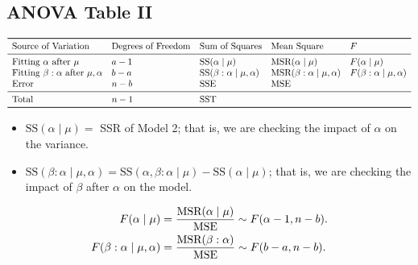 \subsection*{ANOVA Table II}
\[ \begin{array}{lllll}
        \toprule
        \text{Source of Variation}                          & \text{Degrees of Freedom} & \text{Sum of Squares}                  & \text{Mean Square}                      & F                               \\
        \midrule
        \text{Fitting }\alpha\text{ after }\mu              & a-1                       & \text{SS}(\alpha\mid \mu)              & \text{MSR}(\alpha\mid \mu)              & F(\alpha\mid \mu)               \\
        \text{Fitting }\beta:\alpha\text{ after }\mu,\alpha & b-a                       & \text{SS}(\beta:\alpha\mid \mu,\alpha) & \text{MSR}(\beta:\alpha\mid \mu,\alpha) & F(\beta: \alpha\mid \mu,\alpha) \\
        \text{Error}                                        & n-b                       & \SSE                                   & \MSE                                                                      \\
        \midrule
        \text{Total}                                        & n-1                       & \SST                                                                                                               \\
        \bottomrule
    \end{array} \]
\begin{itemize}
    \item $ \text{SS}(\alpha\mid \mu)= $ SSR of Model 2; that is, we are checking the impact of
          $ \alpha $ on the variance.
    \item $ \text{SS}(\beta:\alpha\mid \mu,\alpha)=\text{SS}(\alpha,\beta:\alpha\mid \mu)-\text{SS}(\alpha\mid \mu) $; that is,
          we are checking the impact of $ \beta $ after $ \alpha $ on the model.
\end{itemize}
\begin{align*}
    F(\alpha\mid \mu)
     & =\frac{\text{MSR}(\alpha\mid \mu)}{\text{MSE}} \sim F(\alpha-1,n-b). \\
    F(\beta:\alpha\mid \mu,\alpha)
     & =\frac{\text{MSR}(\beta:\alpha)}{\text{MSE}}\sim F(b-a,n-b).
\end{align*}

